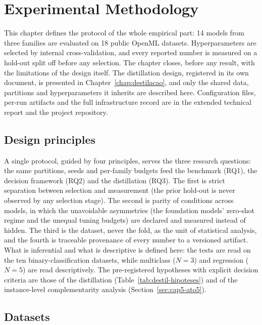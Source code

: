 \chapter{Experimental Methodology}
\label{chap:metodologia}

This chapter defines the protocol of the whole empirical part: 14
models from three families are evaluated on 18 public OpenML
datasets. Hyperparameters are selected by internal cross-validation,
and every reported number is measured on a hold-out split off before
any selection. The chapter closes, before any result, with the
limitations of the design itself. The distillation design,
registered in its own document, is presented in
Chapter~\ref{chap:destilacao}, and only the shared data, partitions
and hyperparameters it inherits are described here. Configuration
files, per-run artifacts and the full infrastructure record are in
the extended technical report and the project repository.

\section{Design principles}
\label{sec:met-visao}

A single protocol, guided by four principles, serves the three
research questions: the same partitions, seeds and per-family
budgets feed the benchmark (RQ1), the decision framework (RQ2) and
the distillation (RQ3). The first is strict separation
between selection and measurement (the prior hold-out is never
observed by any selection stage). The second is parity of conditions
across models, in which the unavoidable asymmetries (the foundation
models' zero-shot regime and the unequal tuning budgets) are
declared and measured instead of hidden. The third is the dataset,
never the fold, as the unit of statistical analysis, and the fourth
is traceable provenance of every number to a versioned artifact.
What is inferential and what is descriptive is defined here: the
tests are read on the ten binary-classification datasets, while
multiclass ($N=3$) and regression ($N=5$) are read descriptively.
The pre-registered hypotheses with explicit decision criteria are
those of the distillation (Table~\ref{tab:destil-hipoteses}) and of
the instance-level complementarity analysis
(Section~\ref{sec:cap5-ato5}).

\section{Datasets}
\label{sec:met-datasets}

